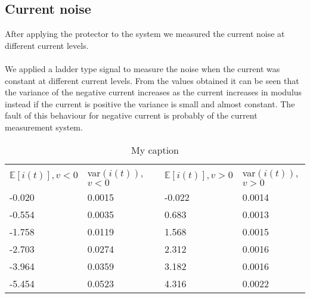 \subsection{Current noise}
After applying the protector to the system we measured the current noise at different current levels.\\ \\
We applied a ladder type signal to measure the noise when the current was constant at different current levels. From the values obtained it can be seen that the variance of the negative current increases as the current increases in modulus instead if the current is positive the variance is small and almost constant. The fault of this behaviour for negative current is probably of the current measurement system.\\
\def\arraystretch{1.2}
\begin{table}[]
\centering
\caption{My caption}
\label{my-label}
\begin{tabular}{lllll}
\cline{1-2} \cline{4-5}
\multicolumn{1}{|l|}{$\mathbb{E}[i(t)], v < 0$} & \multicolumn{1}{l|}{var$(i(t))$, $v<0$} & \multicolumn{1}{l|}{} & \multicolumn{1}{l|}{$\mathbb{E}[i(t)], v >0$} & \multicolumn{1}{l|}{var$(i(t))$, $v>0$} \\ \cline{1-2} \cline{4-5} 
-0.020                                          & 0.0015                                  &                       & -0.022                                        & 0.0014                                  \\
-0.554                                          & 0.0035                                  &                       & 0.683                                         & 0.0013                                  \\
-1.758                                          & 0.0119                                  &                       & 1.568                                         & 0.0015                                  \\
-2.703                                          & 0.0274                                  &                       & 2.312                                         & 0.0016                                  \\
-3.964                                          & 0.0359                                  &                       & 3.182                                         & 0.0016                                  \\
-5.454                                          & 0.0523                                  &                       & 4.316                                         & 0.0022                                  \\ \cline{1-2} \cline{4-5} 
\end{tabular}
\end{table}

